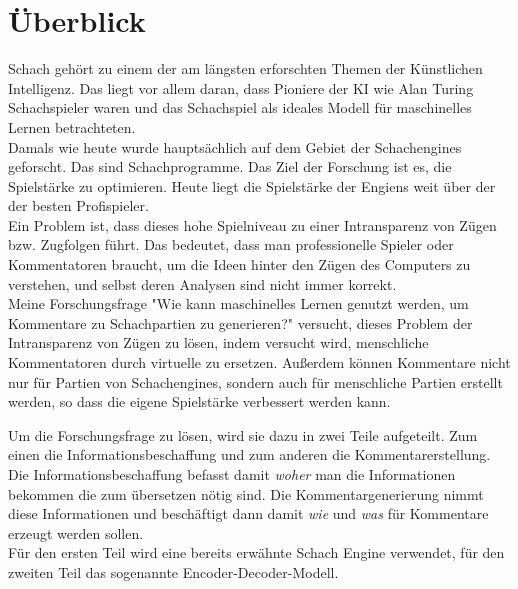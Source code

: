 \section{Überblick}

Schach gehört zu einem der am längsten erforschten Themen der Künstlichen Intelligenz. Das liegt vor allem daran, dass Pioniere der KI wie Alan Turing Schachspieler waren und das Schachspiel als ideales Modell für maschinelles Lernen betrachteten.\\

Damals wie heute wurde hauptsächlich auf dem Gebiet der Schachengines geforscht. Das sind Schachprogramme. Das Ziel der Forschung ist es, die Spielstärke zu optimieren. Heute liegt die Spielstärke der Engiens weit über der der besten Profispieler.\\

Ein Problem ist, dass dieses hohe Spielniveau zu einer Intransparenz von Zügen bzw. Zugfolgen führt. Das bedeutet, dass man professionelle Spieler oder Kommentatoren braucht, um die Ideen hinter den Zügen des Computers zu verstehen, und selbst deren Analysen sind nicht immer korrekt.\\

Meine Forschungsfrage "Wie kann maschinelles Lernen genutzt werden, um Kommentare zu Schachpartien zu generieren?" versucht, dieses Problem der Intransparenz von Zügen zu lösen, indem versucht wird, menschliche Kommentatoren durch virtuelle zu ersetzen. Außerdem können Kommentare nicht nur für Partien von Schachengines, sondern auch für menschliche Partien erstellt werden, so dass die eigene Spielstärke verbessert werden kann.

\newpage

Um die Forschungsfrage zu lösen, wird sie dazu in zwei Teile aufgeteilt. Zum einen die Informationsbeschaffung und zum anderen die Kommentarerstellung. Die Informationsbeschaffung befasst damit \textit{woher} man die Informationen bekommen die zum übersetzen nötig sind. Die Kommentargenerierung nimmt diese Informationen und beschäftigt dann damit \textit{wie} und \textit{was} für Kommentare erzeugt werden sollen.\\

Für den ersten Teil wird eine bereits erwähnte Schach Engine verwendet, für den zweiten Teil das sogenannte Encoder-Decoder-Modell.\\

